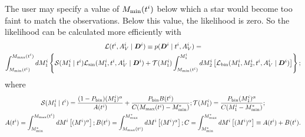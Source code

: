 \documentclass[a4paper,fleqn,usenatbib,onecolumn]{mnras}
\begin{document}
The user may specify a value of $M_{\rm min}(t^i)$ below which a star would become too faint to match the observations. Below this value, the likelihood is zero. So the likelihood can be calculated more efficiently with
\begin{multline}
\mathcal{L}(t^i, A_V^i \mid \bm{D}^i ) \equiv  p(\bm{D}^i \mid t^i, A_V^i) = \\
\int_{M_{\rm min}(t^i)}^{M_{\rm max}(t^i)} dM_1^i \left\{ \mathcal{S}(M_1^i \mid t^i) \mathcal{L}_{\rm sin}(M_1^i, t^i, A_V^i \mid \bm{D}^i )
+ \mathcal{T}(M_1^i) \int_{M_{\rm min}(t^i)}^{M_1^i} dM_2^i\left[ \mathcal{L}_{\rm bin}(M_1^i, M_2^i, t^i, A_V^i \mid \bm{D}^i) \right] \right\};
\end{multline}
where
\begin{multline}
\mathcal{S}(M_1^i \mid t^i) = \dfrac{(1-P_{\rm bin})(M_1^i)^\alpha}{A(t^i)} + \dfrac{P_{\rm bin}B(t^i)}{C (M_{\rm max}(t^i) - M^\ast_{\rm min})};
\mathcal{T}(M_1^i) = \dfrac{P_{\rm bin}(M_1^i)^\alpha}{C(M_1^i - M^\ast_{\rm min})}; \\
A(t^i) = \int_{M^\ast_{\rm min}}^{M_{\rm max}(t^i)} dM^i \left[ (M^i)^\alpha \right]; 
B(t^i) = \int_{M_{\rm max}(t^i)}^{M^\ast_{\rm max}} dM^i \left[ (M^i)^\alpha \right]; 
C = \int_{M^\ast_{\rm min}}^{M^\ast_{\rm max}} dM^i \left[ (M^i)^\alpha \right] \equiv A(t^i) + B(t^i).
\end{multline}

\end{document}

